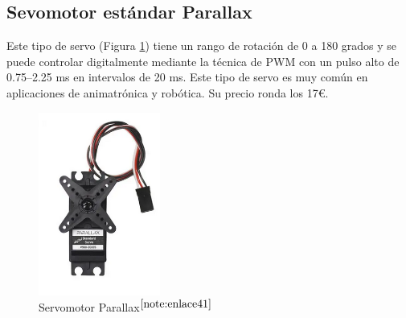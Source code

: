 \setcounter{footnote}{40} %


\subsection{Sevomotor estándar Parallax}

Este tipo de servo (Figura \ref{fig:parallax}) tiene un rango de rotación de 0 a 180 grados y se puede controlar digitalmente mediante la técnica de \ac{PWM} con un pulso alto de 0.75–2.25 ms en intervalos de 20 ms. Este tipo de servo es muy común en aplicaciones de animatrónica y robótica. Su precio ronda los 17€.



\begin{figure} [h!]
	\begin{center}
		\includegraphics[width=4cm]{figs/parallax.png}
	\end{center}
	\caption{Servomotor Parallax$^{\ref{note:enlace41}}$} 
	\label{fig:parallax}
\end{figure}


